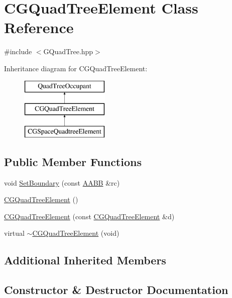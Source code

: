 \hypertarget{class_c_g_quad_tree_element}{}\section{C\+G\+Quad\+Tree\+Element Class Reference}
\label{class_c_g_quad_tree_element}


{\ttfamily \#include $<$G\+Quad\+Tree.\+hpp$>$}

Inheritance diagram for C\+G\+Quad\+Tree\+Element\+:\begin{figure}[H]
\begin{center}
\leavevmode
\includegraphics[height=3.000000cm]{class_c_g_quad_tree_element}
\end{center}
\end{figure}
\subsection*{Public Member Functions}
\begin{DoxyCompactItemize}
\item 
void \hyperlink{class_c_g_quad_tree_element_aa84bbf65a4a56c5697cb46de584dd64b}{Set\+Boundary} (const \hyperlink{struct_a_a_b_b}{A\+A\+B\+B} \&rc)
\item 
\hyperlink{class_c_g_quad_tree_element_a79c5eed98a4f9f866cf80db46da78b5c}{C\+G\+Quad\+Tree\+Element} ()
\item 
\hyperlink{class_c_g_quad_tree_element_aa464707d836ca0bd7afb48ecb5b2350f}{C\+G\+Quad\+Tree\+Element} (const \hyperlink{class_c_g_quad_tree_element}{C\+G\+Quad\+Tree\+Element} \&d)
\item 
virtual \hyperlink{class_c_g_quad_tree_element_aa82b55e3e27e949f7b0ebd3ca56cdc6f}{$\sim$\+C\+G\+Quad\+Tree\+Element} (void)
\end{DoxyCompactItemize}
\subsection*{Additional Inherited Members}


\subsection{Constructor \& Destructor Documentation}
\hypertarget{class_c_g_quad_tree_element_a79c5eed98a4f9f866cf80db46da78b5c}{}
